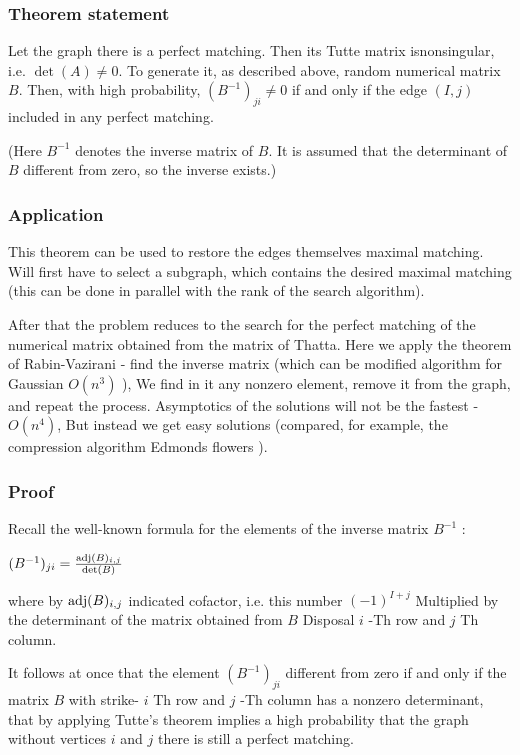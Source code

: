 \subsubsection{ Theorem statement }

Let the graph there is a perfect matching. Then its Tutte matrix is ​​nonsingular, i.e. $\det (A) \ne 0$. To generate it, as described above, random numerical matrix $B$. Then, with high probability, $(B ^ {-1}) _ {ji} \ne 0$ if and only if the edge $(I, j)$ included in any perfect matching.

(Here $B ^ {-1}$ denotes the inverse matrix of $B$. It is assumed that the determinant of $B$ different from zero, so the inverse exists.)

\subsubsection{ Application }

This theorem can be used to restore the edges themselves maximal matching. Will first have to select a subgraph, which contains the desired maximal matching (this can be done in parallel with the rank of the search algorithm).

After that the problem reduces to the search for the perfect matching of the numerical matrix obtained from the matrix of Thatta. Here we apply the theorem of Rabin-Vazirani - find the inverse matrix (which can be modified algorithm for Gaussian $O (n ^ 3)$ ), We find in it any nonzero element, remove it from the graph, and repeat the process. Asymptotics of the solutions will not be the fastest - $O (n ^ 4)$, But instead we get easy solutions (compared, for example, the compression algorithm Edmonds flowers ).

\subsubsection{ Proof }

Recall the well-known formula for the elements of the inverse matrix $B ^ {-1}$ :

$(B^{-1})_{ji}=\frac{{\rm adj}(B)_{i,j}}{\det(B)}$

where by ${\rm adj} (B) _ {i, j}$ indicated cofactor, i.e. this number $(-1) ^ {I + j}$ Multiplied by the determinant of the matrix obtained from $B$ Disposal $i$ -Th row and $j$ Th column.

It follows at once that the element $(B ^ {-1}) _ {ji}$ different from zero if and only if the matrix $B$ with strike- $i$ Th row and $j$ -Th column has a nonzero determinant, that by applying Tutte's theorem implies a high probability that the graph without vertices $i$ and $j$ there is still a perfect matching.

